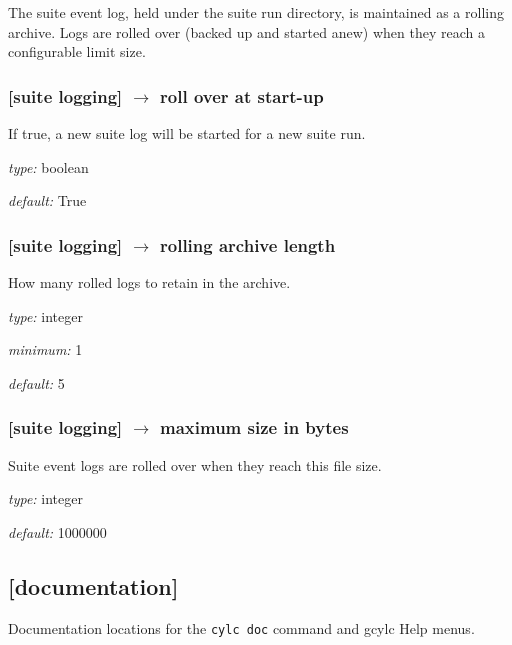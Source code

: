 The suite event log, held under the suite run directory, is maintained
as a rolling archive. Logs are rolled over (backed up and started anew)
when they reach a configurable limit size.

\subsubsection[roll over at start-up]{[suite logging] $\rightarrow$ roll over at start-up}

If true, a new suite log will be started for a new suite run.

\begin{myitemize}
\item {\em type:} boolean
\item {\em default:} True
\end{myitemize}

\subsubsection[rolling archive length]{[suite logging] $\rightarrow$ rolling archive length}

How many rolled logs to retain in the archive.

\begin{myitemize}
\item {\em type:} integer
\item {\em minimum:} 1
\item {\em default:} 5
\end{myitemize}

\subsubsection[maximum size in bytes]{[suite logging] $\rightarrow$ maximum size in bytes}

Suite event logs are rolled over when they reach this file size. 

\begin{myitemize}
\item {\em type:} integer
\item {\em default:} 1000000 
\end{myitemize}

\subsection{[documentation]}

Documentation locations for the \lstinline=cylc doc= command and gcylc
Help menus. 

